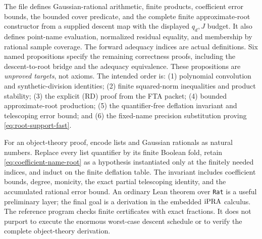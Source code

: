The file  defines Gaussian-rational
arithmetic, finite products, coefficient error bounds, the bounded cover
predicate, and the complete finite approximate-root constructor from a
supplied descent map with the displayed \(q_d,J\) budget. It also defines
point-name evaluation, normalized residual equality, and membership by
rational sample coverage. The forward adequacy indices are actual
definitions. Six named propositions specify the remaining correctness
proofs, including the descent-to-root bridge and the adequacy equivalence.
These propositions are \emph{unproved targets}, not axioms. The intended order
is: (1) polynomial convolution and synthetic-division identities;
(2) finite squared-norm inequalities and product stability;
(3) the explicit (RD) proof from the FTA packet;
(4) bounded approximate-root production; (5) the quantifier-free
deflation invariant and telescoping error bound; and (6) the fixed-name
precision substitution proving \eqref{eq:root-support-fast}.

For an object-theory proof, encode lists and Gaussian rationals as natural
numbers. Replace every list quantifier by its finite Boolean fold, retain
\eqref{eq:coefficient-name-root} as a hypothesis instantiated only at
the finitely needed indices, and induct on the finite deflation table.
The invariant includes coefficient bounds, degree, monicity, the exact
partial telescoping identity, and the accumulated rational error bound.
An ordinary Lean theorem over \texttt{Rat} is a useful preliminary layer;
the final goal is a derivation in the embedded \(\mathrm{iPRA}\) calculus.
The reference program checks finite certificates with exact fractions.
It does not purport to execute the enormous worst-case descent schedule
or to verify the complete object-theory derivation.
